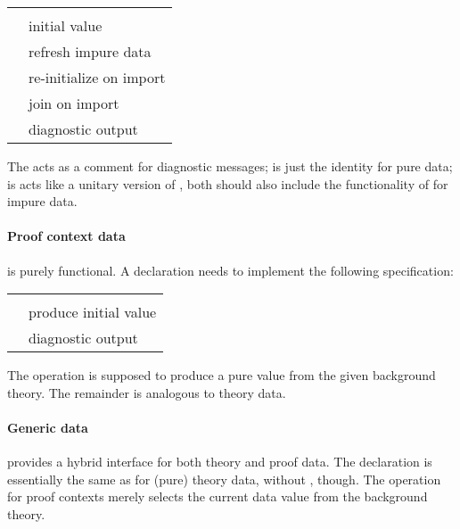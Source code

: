 \begin{isabellebody}
\begin{isamarkuptext}
  \medskip
  \begin{tabular}{ll}
  \isa{name{\isacharcolon}\ string} \\
  \isa{empty{\isacharcolon}\ T} & initial value \\
  \isa{copy{\isacharcolon}\ T\ {\isasymrightarrow}\ T} & refresh impure data \\
  \isa{extend{\isacharcolon}\ T\ {\isasymrightarrow}\ T} & re-initialize on import \\
  \isa{merge{\isacharcolon}\ T\ {\isasymtimes}\ T\ {\isasymrightarrow}\ T} & join on import \\
  \isa{print{\isacharcolon}\ T\ {\isasymrightarrow}\ unit} & diagnostic output \\
  \end{tabular}
  \medskip

  \noindent The  acts as a comment for diagnostic
  messages;  is just the identity for pure data;  is acts like a unitary version of , both
  should also include the functionality of  for impure
  data.

  \paragraph{Proof context data} is purely functional.  A declaration
  needs to implement the following specification:

  \medskip
  \begin{tabular}{ll}
  \isa{name{\isacharcolon}\ string} \\
  \isa{init{\isacharcolon}\ theory\ {\isasymrightarrow}\ T} & produce initial value \\
  \isa{print{\isacharcolon}\ T\ {\isasymrightarrow}\ unit} & diagnostic output \\
  \end{tabular}
  \medskip

  \noindent The  operation is supposed to produce a pure
  value from the given background theory.  The remainder is analogous
  to theory data.

  \paragraph{Generic data} provides a hybrid interface for both theory
  and proof data.  The declaration is essentially the same as for
  (pure) theory data, without , though.  The  operation for proof contexts merely selects the current data
  value from the background theory.


\end{isamarkuptext}
\end{isabellebody}
